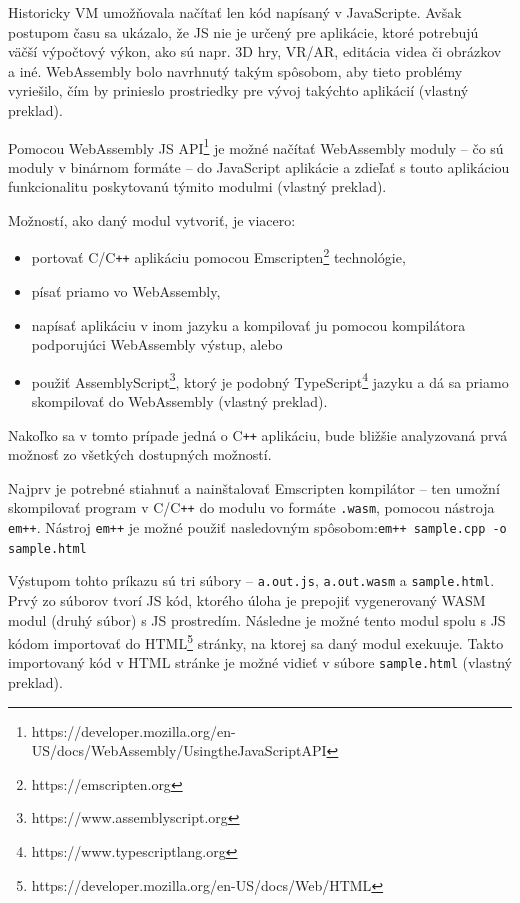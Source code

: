 Historicky VM umožňovala načítať len kód napísaný v JavaScripte. Avšak postupom času sa ukázalo, že JS nie je určený pre aplikácie, ktoré potrebujú väčší výpočtový výkon, ako sú napr. 3D hry, VR/AR, editácia videa či obrázkov a iné.
WebAssembly bolo navrhnutý takým spôsobom, aby tieto problémy vyriešilo, čím by prinieslo prostriedky pre vývoj takýchto aplikácií \cite{webassembly_concepts} (vlastný preklad). 

Pomocou WebAssembly JS API\footnote{https://developer.mozilla.org/en-US/docs/WebAssembly/Using\textunderscore the\textunderscore JavaScript\textunderscore API} je možné načítať WebAssembly moduly -- čo sú moduly v binárnom formáte -- do JavaScript aplikácie a zdieľať s touto aplikáciou funkcionalitu poskytovanú týmito modulmi \cite{webassembly_concepts} (vlastný preklad).

\clearpage

Možností, ako daný modul vytvoriť, je viacero:
\begin {itemize}
\item {portovať C/C\texttt{++} aplikáciu pomocou Emscripten\footnote{https://emscripten.org} technológie,}
\item {písať priamo vo WebAssembly,}
\item {napísať aplikáciu v inom jazyku a kompilovať ju pomocou kompilátora podporujúci WebAssembly výstup, alebo}
\item {použiť AssemblyScript\footnote{https://www.assemblyscript.org}, ktorý je podobný TypeScript\footnote{https://www.typescriptlang.org} jazyku a dá sa priamo skompilovať do WebAssembly \cite{webassembly_concepts} (vlastný preklad).}
\end {itemize}

Nakoľko sa v tomto prípade jedná o C\texttt{++} aplikáciu, bude bližšie analyzovaná prvá možnosť zo všetkých dostupných možností.

Najprv je potrebné stiahnuť a nainštalovať Emscripten kompilátor -- ten umožní skompilovať program v C/C\texttt{++} do modulu vo formáte \texttt{.wasm}, pomocou nástroja \texttt{em++}. Nástroj \texttt{em++} je možné použiť nasledovným spôsobom:\newline \texttt{em++ sample.cpp -o sample.html} 

Výstupom tohto príkazu sú tri súbory -- \texttt{a.out.js}, \texttt{a.out.wasm} a \texttt{sample.html}. Prvý zo súborov tvorí JS kód, ktorého úloha je prepojiť vygenerovaný WASM modul (druhý súbor) s JS prostredím. Následne je možné tento modul spolu s JS kódom importovať do HTML\footnote{https://developer.mozilla.org/en-US/docs/Web/HTML} stránky, na ktorej sa daný modul exekuuje. Takto importovaný kód v HTML stránke je možné vidieť v súbore \texttt{sample.html} \cite{cpp_to_wasm} (vlastný preklad).


